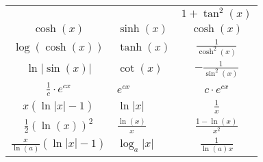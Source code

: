 \begin{center}
\begin{tabularx}{\linewidth}{c>{\centering\arraybackslash}Xc}
                                           &                          & $1 + \tan^2(x)$          \\
    $\cosh(x)$                             & $\sinh(x)$               & $\cosh(x)$               \\
    $\log(\cosh(x))$                       & $\tanh(x)$               & $\frac{1}{\cosh^2(x)}$   \\
    $\ln | \sin(x)|$                       & $\cot(x)$                & $-\frac{1}{\sin^2(x)}$   \\
    $\frac{1}{c} \cdot e^{cx}$             & $e^{cx}$                 & $c \cdot e^{cx}$         \\
    $x(\ln |x| - 1)$                       & $\ln |x|$                & $\frac{1}{x}$            \\
    $\frac{1}{2}(\ln(x))^2$                & $\frac{\ln(x)}{x}$       & $\frac{1 - \ln(x)}{x^2}$ \\
    $\frac{x}{\ln(a)} (\ln|x| -1)$         & $\log_a |x|$             & $\frac{1}{\ln(a)x}$      \\

  \end{tabularx}
\end{center}

